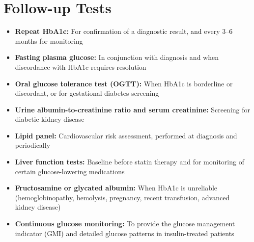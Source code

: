 \section*{Follow-up Tests}
\begin{itemize}
  \item \textbf{Repeat HbA1c:} For confirmation of a diagnostic result, and every 3--6 months for monitoring
  \item \textbf{Fasting plasma glucose:} In conjunction with diagnosis and when discordance with HbA1c requires resolution
  \item \textbf{Oral glucose tolerance test (OGTT):} When HbA1c is borderline or discordant, or for gestational diabetes screening
  \item \textbf{Urine albumin-to-creatinine ratio and serum creatinine:} Screening for diabetic kidney disease
  \item \textbf{Lipid panel:} Cardiovascular risk assessment, performed at diagnosis and periodically
  \item \textbf{Liver function tests:} Baseline before statin therapy and for monitoring of certain glucose-lowering medications
  \item \textbf{Fructosamine or glycated albumin:} When HbA1c is unreliable (hemoglobinopathy, hemolysis, pregnancy, recent transfusion, advanced kidney disease)
  \item \textbf{Continuous glucose monitoring:} To provide the glucose management indicator (GMI) and detailed glucose patterns in insulin-treated patients
\end{itemize}

